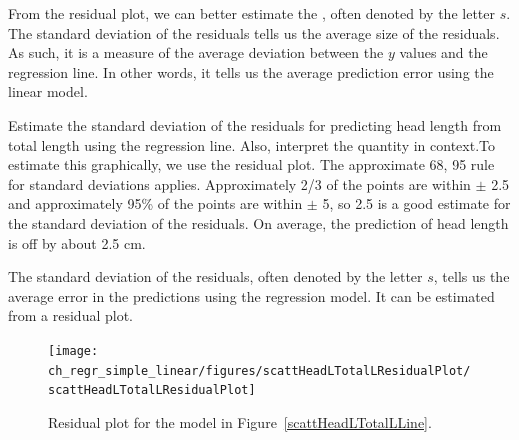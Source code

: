 From the residual plot, we can better estimate the , often denoted by the letter $s$. %
The standard deviation of the residuals tells us the average size of the residuals.  As such, it is a measure of the average deviation between the $y$ values and the regression line.  In other words, it tells us the average prediction error using the linear model.

\begin{example}{Estimate the standard deviation of the residuals for predicting head length from total length using the regression line.  Also, interpret the quantity in context.}To estimate this graphically, we use the residual plot.  The approximate 68, 95 rule for standard deviations applies.  Approximately 2/3 of the points are within $\pm$ 2.5 and approximately 95\% of the points are within $\pm$ 5, so 2.5 is a good estimate for the standard deviation of the residuals.  On average, the prediction of head length is off by about 2.5 cm.


\end{example}

\begin{termBox}{
The standard deviation of the residuals, often denoted by the letter $s$, tells us the average error in the predictions using the regression model.  It can be estimated from a residual plot.}
\end{termBox}

\begin{figure}
   \centering
   \texttt{[image: ch\_regr\_simple\_linear/figures/scattHeadLTotalLResidualPlot/scattHeadLTotalLResidualPlot]}
   \caption{Residual plot for the model in Figure~\ref{scattHeadLTotalLLine}.}
   \label{scattHeadLTotalLResidualPlot}
\end{figure}

